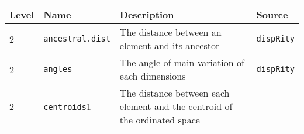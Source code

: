 \documentclass[
]{book}
\begin{document}
\begin{longtable}[]{@{}llll@{}}
\toprule
\begin{minipage}[b]{0.07\columnwidth}\raggedright
Level\strut
\end{minipage} & \begin{minipage}[b]{0.07\columnwidth}\raggedright
Name\strut
\end{minipage} & \begin{minipage}[b]{0.64\columnwidth}\raggedright
Description\strut
\end{minipage} & \begin{minipage}[b]{0.10\columnwidth}\raggedright
Source\strut
\end{minipage}\tabularnewline
\midrule
\endhead
\begin{minipage}[t]{0.07\columnwidth}\raggedright
2\strut
\end{minipage} & \begin{minipage}[t]{0.07\columnwidth}\raggedright
\texttt{ancestral.dist}\strut
\end{minipage} & \begin{minipage}[t]{0.64\columnwidth}\raggedright
The distance between an element and its ancestor\strut
\end{minipage} & \begin{minipage}[t]{0.10\columnwidth}\raggedright
\texttt{dispRity}\strut
\end{minipage}\tabularnewline
\begin{minipage}[t]{0.07\columnwidth}\raggedright
2\strut
\end{minipage} & \begin{minipage}[t]{0.07\columnwidth}\raggedright
\texttt{angles}\strut
\end{minipage} & \begin{minipage}[t]{0.64\columnwidth}\raggedright
The angle of main variation of each dimensions\strut
\end{minipage} & \begin{minipage}[t]{0.10\columnwidth}\raggedright
\texttt{dispRity}\strut
\end{minipage}\tabularnewline
\begin{minipage}[t]{0.07\columnwidth}\raggedright
2\strut
\end{minipage} & \begin{minipage}[t]{0.07\columnwidth}\raggedright
\texttt{centroids}1\strut
\end{minipage} & \begin{minipage}[t]{0.64\columnwidth}\raggedright
The distance between each element and the centroid of the ordinated space\strut

\end{minipage}
\end{longtable}
\end{document}

